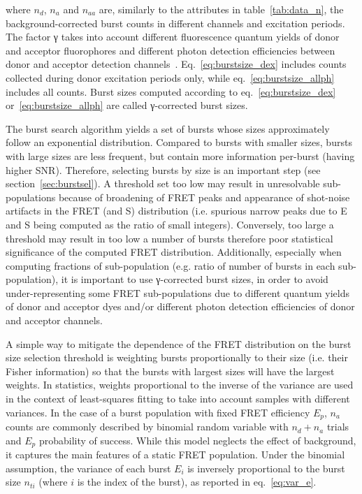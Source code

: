 \noindent where $n_d$, $n_a$ and $n_{aa}$ are, similarly to the attributes
in table~\ref{tab:data_n}, the background-corrected
burst counts in different channels and excitation periods.
The factor γ takes into account
different fluorescence quantum yields of donor and acceptor fluorophores and different
photon detection efficiencies between donor and acceptor detection
channels~\cite{Deniz_1999,Lee_2005}.
Eq.~\ref{eq:burstsize_dex} includes counts collected during donor excitation periods only,
while eq.~\ref{eq:burstsize_allph} includes all counts.
Burst sizes computed according to eq.~\ref{eq:burstsize_dex}
or~\ref{eq:burstsize_allph} are called γ-corrected burst sizes.

The burst search algorithm yields a set of bursts whose sizes
approximately follow an exponential distribution.
Compared to bursts with smaller sizes, bursts with large sizes are less frequent, 
but contain more information per-burst (having higher SNR).
Therefore, selecting bursts by size is an important step (see section~\ref{sec:burstsel}).
A threshold set too low may result in unresolvable sub-populations
because of broadening of FRET peaks and appearance of shot-noise artifacts
in the FRET (and S) distribution (i.e. spurious narrow peaks due to E and S being
computed as the ratio of small integers).
Conversely, too large a threshold may result in too low a number of bursts
therefore poor statistical significance of the computed FRET distribution.
Additionally, especially when computing fractions of sub-population 
(e.g. ratio of number of bursts in each sub-population),
it is important to use γ-corrected burst sizes,
in order to avoid under-representing some FRET sub-populations
due to different quantum yields of donor and acceptor dyes and/or
different photon detection efficiencies of donor and acceptor channels.

A simple way to mitigate the dependence of the FRET distribution on 
the burst size selection threshold is weighting bursts proportionally to their size 
(i.e. their Fisher information)
so that the bursts with largest sizes will have the largest weights.
In statistics, weights proportional to the inverse of the variance are used 
in the context of least-squares fitting to take into account samples
with different variances. In the case of a burst population with fixed FRET efficiency $E_p$, 
$n_a$ counts are commonly described by binomial random variable with $n_d + n_a$ trials 
and $E_p$ probability of success. While this model neglects the effect of background, it captures
the main features of a static FRET population. Under the binomial assumption,
the variance of each burst $E_i$ is inversely proportional to the burst size $n_{ti}$ 
(where $i$ is the index of the burst),
as reported in eq.~\ref{eq:var_e}.

